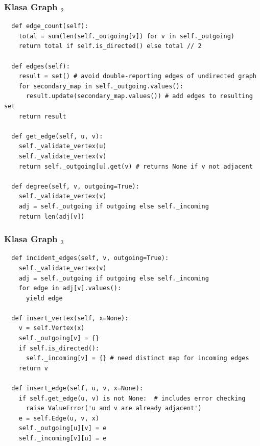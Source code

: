 \documentclass[compress]{beamer}
\begin{document}
\begin{frame}
  \frametitle{Klasa Graph $_2$}
\begin{verbatim}
  def edge_count(self):
    total = sum(len(self._outgoing[v]) for v in self._outgoing)
    return total if self.is_directed() else total // 2

  def edges(self):
    result = set() # avoid double-reporting edges of undirected graph
    for secondary_map in self._outgoing.values():
      result.update(secondary_map.values()) # add edges to resulting set
    return result

  def get_edge(self, u, v):
    self._validate_vertex(u)
    self._validate_vertex(v)
    return self._outgoing[u].get(v) # returns None if v not adjacent

  def degree(self, v, outgoing=True):   
    self._validate_vertex(v)
    adj = self._outgoing if outgoing else self._incoming
    return len(adj[v])
\end{verbatim}
\end{frame}

\begin{frame}
  \frametitle{Klasa Graph $_3$}
\begin{verbatim}
  def incident_edges(self, v, outgoing=True):   
    self._validate_vertex(v)
    adj = self._outgoing if outgoing else self._incoming
    for edge in adj[v].values():
      yield edge

  def insert_vertex(self, x=None):
    v = self.Vertex(x)
    self._outgoing[v] = {}
    if self.is_directed():
      self._incoming[v] = {} # need distinct map for incoming edges
    return v
      
  def insert_edge(self, u, v, x=None):
    if self.get_edge(u, v) is not None:  # includes error checking
      raise ValueError('u and v are already adjacent')
    e = self.Edge(u, v, x)
    self._outgoing[u][v] = e
    self._incoming[v][u] = e
\end{verbatim}
\end{frame}
\end{document}
